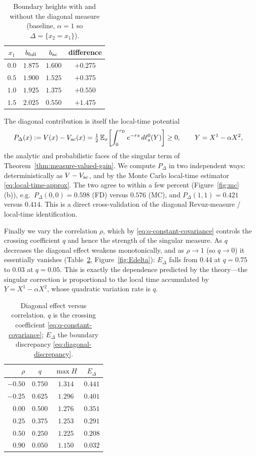 \documentclass[pdflatex,sn-mathphys-num]{sn-jnl}
\theoremstyle{plain}
\theoremstyle{definition}
\theoremstyle{remark}
\numberwithin{equation}{section}
\begin{document}
\begin{table}[t]
\centering
\caption{Boundary heights with and without the diagonal measure (baseline,
$\alpha=1$ so $\Delta=\{x_2=x_1\}$).}
\label{tab:diagonal}
\begin{tabular}{cccc}
\toprule
$x_1$ & $b_{\rm full}$ & $b_{\rm ac}$ & difference \\
\midrule
$0.0$ & $1.875$ & $1.600$ & $+0.275$ \\
$0.5$ & $1.900$ & $1.525$ & $+0.375$ \\
$1.0$ & $1.925$ & $1.375$ & $+0.550$ \\
$1.5$ & $2.025$ & $0.550$ & $+1.475$ \\
\bottomrule
\end{tabular}
\end{table}

The diagonal contribution is itself the local-time potential
\[
P_\Delta(x) := V(x)-V_{\rm ac}(x)
= \tfrac12\,\mathbb E_x\!\left[\int_0^{\tau_{\mathcal D}}
e^{-rs}\,d\ell^0_s(Y)\right]\ge0,
\qquad Y=X^1-\alpha X^2,
\]
the analytic and probabilistic faces of the singular term of
Theorem~\ref{thm:measure-valued-gain}. We compute $P_\Delta$ in two independent
ways: deterministically as $V-V_{\rm ac}$, and by the Monte Carlo local-time
estimator \eqref{eq:local-time-approx}. The two agree to within a few percent
(Figure~\ref{fig:mc}(b)), e.g.\ $P_\Delta(0,0)=0.598$ (FD) versus $0.576$ (MC),
and $P_\Delta(1,1)=0.421$ versus $0.414$. This is a direct cross-validation of
the diagonal Revuz-measure / local-time identification.

Finally we vary the correlation $\rho$, which by \eqref{eq:q-constant-covariance}
controls the crossing coefficient $q$ and hence the strength of the singular
measure. As $q$ decreases the diagonal effect weakens monotonically, and as
$\rho\to1$ (so $q\to0$) it essentially vanishes (Table~\ref{tab:rho},
Figure~\ref{fig:Edelta}): $E_\Delta$ falls from $0.44$ at $q=0.75$ to $0.03$ at
$q=0.05$. This is exactly the dependence predicted by the theory---the singular
correction is proportional to the local time accumulated by $Y=X^1-\alpha X^2$,
whose quadratic variation rate is $q$.

\begin{table}[t]
\centering
\caption{Diagonal effect versus correlation. $q$ is the crossing coefficient
\eqref{eq:q-constant-covariance}; $E_\Delta$ the boundary discrepancy
\eqref{eq:diagonal-discrepancy}.}
\label{tab:rho}
\begin{tabular}{rccc}
\toprule
$\rho$ & $q$ & $\max H$ & $E_\Delta$ \\
\midrule
$-0.50$ & $0.750$ & $1.314$ & $0.441$ \\
$-0.25$ & $0.625$ & $1.296$ & $0.401$ \\
$ 0.00$ & $0.500$ & $1.276$ & $0.351$ \\
$ 0.25$ & $0.375$ & $1.253$ & $0.291$ \\
$ 0.50$ & $0.250$ & $1.225$ & $0.208$ \\
$ 0.90$ & $0.050$ & $1.150$ & $0.032$ \\
\bottomrule
\end{tabular}
\end{table}
\end{document}
